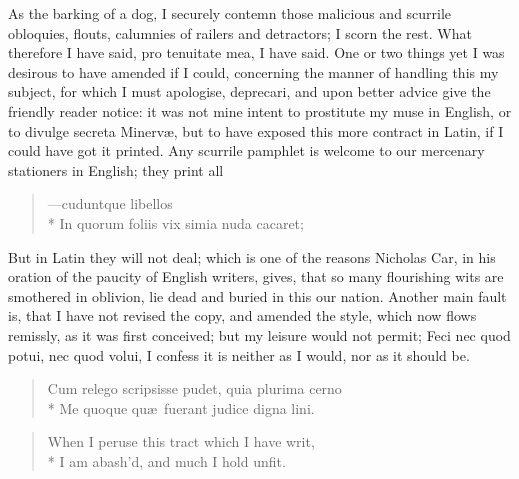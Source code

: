 {As the barking of a dog, I securely contemn those malicious and
scurrile obloquies, flouts, calumnies of railers and detractors; I
scorn the rest. What therefore I have said, pro tenuitate mea, I have
said.
One or two things yet I was desirous to have amended if I could,
concerning the manner of handling this my subject, for which I must
apologise, deprecari, and upon better advice give the friendly reader
notice: it was not mine intent to prostitute my muse in English, or to
divulge secreta Minerv\ae{}, but to have exposed this more contract in
Latin, if I could have got it printed. Any scurrile pamphlet is welcome
to our mercenary stationers in English; they print all

\begin{verse}
---\textlatin{cuduntque libellos}\\*
\textlatin{In quorum foliis vix simia nuda cacaret};
\end{verse}

But in Latin they will not deal; which is one of the reasons
Nicholas Car, in his oration of the paucity of English writers,
gives, that so many flourishing wits are smothered in oblivion, lie
dead and buried in this our nation. Another main fault is, that I have
not revised the copy, and amended the style, which now flows remissly,
as it was first conceived; but my leisure would not permit; Feci nec
quod potui, nec quod volui, I confess it is neither as I would, nor as
it should be.

\begin{verse}
\textlatin{Cum relego scripsisse pudet, quia plurima cerno}\\*
\textlatin{Me quoque qu\ae{}\ fuerant judice digna lini.}
\end{verse}

\begin{verse}
When I peruse this tract which I have writ,\\*
I am abash'd, and much I hold unfit.
\end{verse}

}
